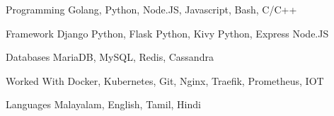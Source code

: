 


\begin{cvskills}


\cvskill
{Programming} %
{Golang, Python, Node.JS, Javascript, Bash, C/C++} %


\cvskill
{Framework} %
{Django Python, Flask Python, Kivy Python, Express Node.JS} %


\cvskill
{Databases} %
{MariaDB, MySQL, Redis, Cassandra} %


\cvskill
{Worked With} %
{Docker, Kubernetes, Git, Nginx, Traefik, Prometheus, IOT} %


\cvskill
{Languages} %
{Malayalam, English, Tamil, Hindi} %


\end{cvskills}